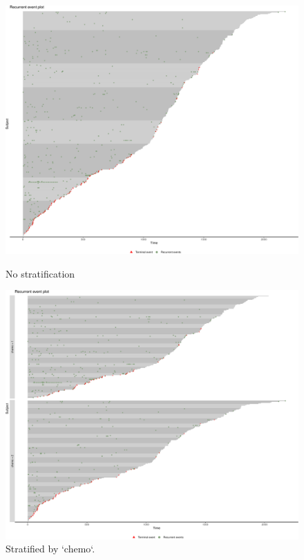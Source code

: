 \vspace*{-.3cm}\begin{figure}[H]
    \centering
    \begin{minipage}{0.245\textwidth}
        \centering
        \includegraphics[scale = .125]{images/ep-1}
        \caption{No stratification}
    \end{minipage}\hfill
    \begin{minipage}{0.245\textwidth}
        \centering
        \includegraphics[scale = .125]{images/ep-2}
        \caption{Stratified by `chemo`.}
    \end{minipage}
\end{figure}

